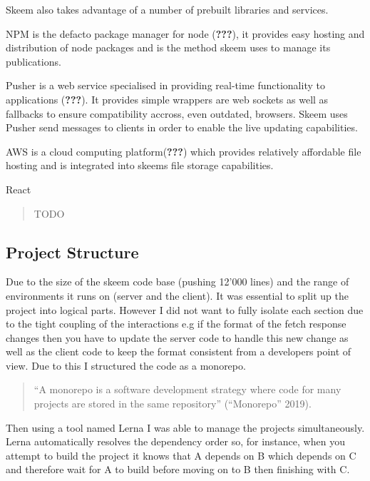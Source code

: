 \documentclass[
  12pt,
]{article}
\providecommand{\tightlist}{%
  \setlength{\itemsep}{0pt}\setlength{\parskip}{0pt}}
\begin{document}
Skeem also takes advantage of a number of prebuilt libraries and
services.

\begin{description}
\tightlist
\item[NPM]
NPM is the defacto package manager for node ({\textbf{???}}), it
provides easy hosting and distribution of node packages and is the
method skeem uses to manage its publications.
\item[Pusher]
Pusher is a web service specialised in providing real-time functionality
to applications ({\textbf{???}}). It provides simple wrappers are web
sockets as well as fallbacks to ensure compatibility accross, even
outdated, browsers. Skeem uses Pusher send messages to clients in order
to enable the live updating capabilities.
\item[Amazon Web Services]
AWS is a cloud computing platform({\textbf{???}}) which provides
relatively affordable file hosting and is integrated into skeems file
storage capabilities.
\item[React]
React
\end{description}

\begin{quote}
TODO
\end{quote}

\hypertarget{project-structure}{%
\subsection{Project Structure}\label{project-structure}}

Due to the size of the skeem code base (pushing 12'000 lines) and the
range of environments it runs on (server and the client). It was
essential to split up the project into logical parts. However I did not
want to fully isolate each section due to the tight coupling of the
interactions e.g if the format of the fetch response changes then you
have to update the server code to handle this new change as well as the
client code to keep the format consistent from a developers point of
view. Due to this I structured the code as a monorepo.

\begin{quote}
``A monorepo is a software development strategy where code for many
projects are stored in the same repository'' (``Monorepo'' 2019).
\end{quote}

Then using a tool named Lerna I was able to manage the projects
simultaneously. Lerna automatically resolves the dependency order so,
for instance, when you attempt to build the project it knows that A
depends on B which depends on C and therefore wait for A to build before
moving on to B then finishing with C.
\end{document}
